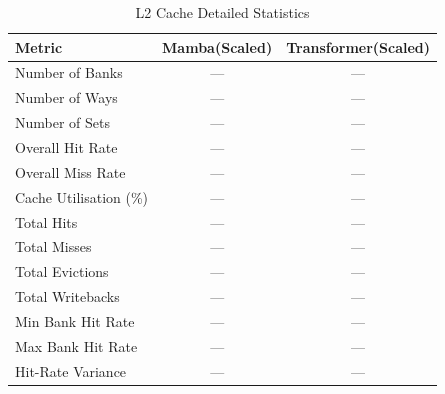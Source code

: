 \begin{table}[h]\centering
    \caption{L2 Cache Detailed Statistics}
    \label{tab:l2_detailed}
    \begin{tabular}{lcc}\hline
    Metric & Mamba(Scaled) & Transformer(Scaled) \\\hline
        Number of Banks & --- & --- \\
    Number of Ways & --- & --- \\
    Number of Sets & --- & --- \\
    Overall Hit Rate & --- & --- \\
    Overall Miss Rate & --- & --- \\
    Cache Utilisation (\%) & --- & --- \\
    Total Hits & --- & --- \\
    Total Misses & --- & --- \\
    Total Evictions & --- & --- \\
    Total Writebacks & --- & --- \\
    Min Bank Hit Rate & --- & --- \\
    Max Bank Hit Rate & --- & --- \\
    Hit-Rate Variance & --- & --- \\
\hline\end{tabular}\end{table}